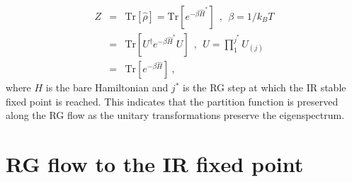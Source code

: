 \documentclass[aps,prb,preprint,groupedaddress]{revtex4-2}
\begin{document}
\begin{eqnarray}
Z &=& \mathrm{Tr}\left[ \hat{\rho}\right] 
= \mathrm{Tr}\left[ e^{-\beta \hat{H}^{*}}\right]~~,~~\beta=1/k_{B}T\nonumber\\
&=& \mathrm{Tr}\left[ U^{\dagger} e^{-\beta \hat{H}^{*}} U\right]~~,~~U = \prod_{1}^{j^{*}}U_{(j)}\nonumber\\
&=& \mathrm{Tr}\left[ e^{-\beta \hat{H}}\right]~,
\label{partfunc}
\end{eqnarray}
where $H$ is the bare Hamiltonian and $j^{*}$ is the RG step at which the IR stable fixed point is reached. This indicates that the partition function is preserved along the RG flow as the unitary transformations preserve the eigenspectrum.
\section{RG flow to the IR fixed point}\label{fixedPointKondo}
\par\noindent
\end{document}
